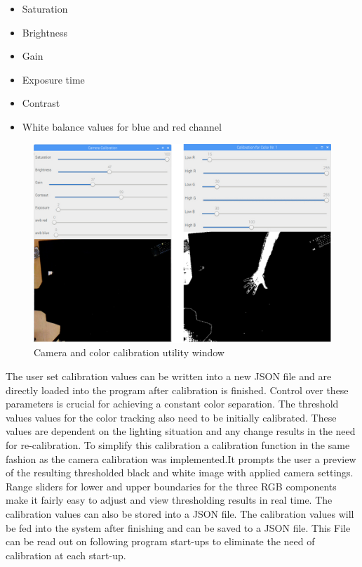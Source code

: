\begin{itemize}
\item Saturation
\item Brightness
\item Gain
\item Exposure time
\item Contrast
\item White balance values for blue and red channel
\end{itemize}
\begin{figure}[H]
\includegraphics[width=\textwidth]{images/calib_windows.jpg}
\caption{Camera and color calibration utility window}
\label{fig:calibration_windows} 
\end{figure}
The user set calibration values can be written into a new JSON file and are directly loaded into the program after calibration is finished. Control over these parameters is crucial for achieving a constant color separation. The threshold values values for the color tracking also need to be initially calibrated. These values are dependent on the lighting situation and any change results in the need for re-calibration. To simplify this calibration a calibration function in the same fashion as the camera calibration was implemented.It prompts the user a preview of the resulting thresholded black and white image with applied camera settings. Range sliders for lower and upper boundaries for the three RGB components make it fairly easy to adjust and view thresholding results in real time. The calibration values can also be stored into a JSON file. The calibration values will be fed into the system after finishing and can be saved to a JSON file. This File can be read out on following program start-ups to eliminate the need of calibration at each start-up.
